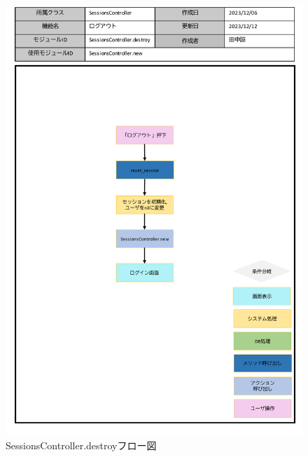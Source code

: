 \begin{figure}
	\centering
	\includegraphics[scale=0.6]{img/Sessions/pptx/SessionsController_destroy.pdf}
	\caption{SessionsController.destroyフロー図}
\end{figure}
